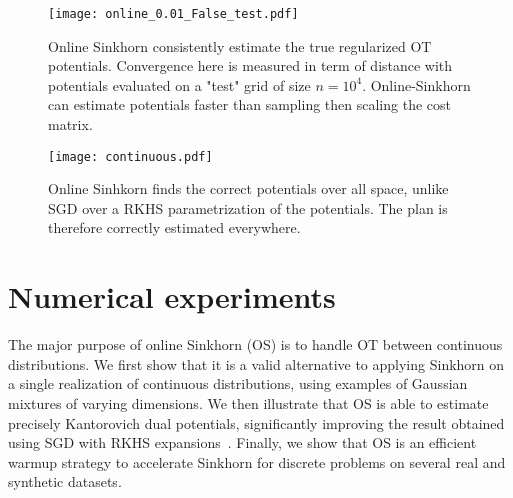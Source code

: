 \begin{figure}[t]
    \centering
    \begin{widepage}
    \texttt{[image: online\_0.01\_False\_test.pdf]}
    \end{widepage}
    \caption{Online Sinkhorn consistently estimate the true regularized OT potentials. Convergence here is measured in term of distance with potentials evaluated on a "test" grid of size $n=10^4$. Online-Sinkhorn can estimate potentials faster than sampling then scaling the cost matrix.}
    \label{fig:convergence}
\end{figure}

\begin{figure}[t]
    \centering
    \begin{widepage}
    \texttt{[image: continuous.pdf]}
    \end{widepage}
    \caption{Online Sinhkorn finds the correct potentials over all space, unlike SGD over a RKHS parametrization of the potentials. The plan is therefore correctly estimated everywhere.}
    \label{fig:potentials}
    \vspace{-1em}
\end{figure}

\section{Numerical experiments}\label{sec:exps}



The major purpose of online Sinkhorn (OS) is to handle OT between continuous
distributions.  We first show that it is a valid alternative to applying Sinkhorn
on a single realization of continuous distributions, using examples of Gaussian mixtures of varying dimensions.
%
We then illustrate that OS is able to estimate precisely
Kantorovich dual potentials, significantly improving the result obtained using SGD with RKHS
expansions~\citep{2016-genevay-nips}.
%
Finally, we show that OS is an efficient warmup strategy to accelerate Sinkhorn for discrete problems on several real and synthetic datasets.


